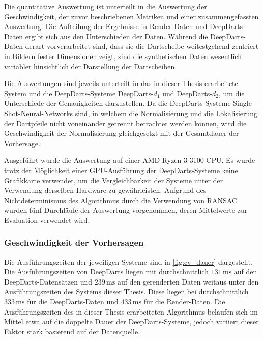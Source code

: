 Die quantitative Auswertung ist unterteilt in die Auswertung der Geschwindigkeit, der zuvor beschriebenen Metriken und einer zusammengefassten Auswertung. Die Aufteilung der Ergebnisse in Render-Daten und DeepDarts-Daten ergibt sich aus den Unterschieden der Daten. Während die DeepDarts-Daten derart vorverarbeitet sind, dass sie die Dartscheibe weitestgehend zentriert in Bildern fester Dimensionen zeigt, sind die synthetischen Daten wesentlich variabler hinsichtlich der Darstellung der Dartscheiben.

Die Auswertungen sind jeweils unterteilt in das in dieser Thesis erarbeitete System und die DeepDarts-Systeme DeepDarts-$d_1$ und DeepDarts-$d_2$, um die Unterschiede der Genauigkeiten darzustellen. Da die DeepDarts-Systeme Single-Shot-Neural-Networks sind, in welchem die Normalisierung und die Lokalisierung der Dartpfeile nicht voneinander getrennt betrachtet werden können, wird die Geschwindigkeit der Normalisierung gleichgesetzt mit der Gesamtdauer der Vorhersage.

Ausgeführt wurde die Auswertung auf einer AMD Ryzen 3 3100 CPU. Es wurde trotz der Möglichkeit einer GPU-Ausführung der DeepDarts-Systeme keine Grafikkarte verwendet, um die Vergleichbarkeit der Systeme unter der Verwendung derselben Hardware zu gewährleisten. Aufgrund des Nichtdeterminismus des Algorithmus durch die Verwendung von RANSAC wurden fünf Durchläufe der Auswertung vorgenommen, deren Mittelwerte zur Evaluation verwendet wird.

\subsubsection{Geschwindigkeit der Vorhersagen} %

\ExecutionTimes

Die Ausführungszeiten der jeweiligen Systeme sind in \autoref{fig:cv_dauer} dargestellt. Die Ausführungszeiten von DeepDarts liegen mit durchschnittlich $131\,\text{ms}$ auf den DeepDarts-Datensätzen und $239\,\text{ms}$ auf den gerenderten Daten weitaus unter den Ausführungszeiten des Systems dieser Thesis. Diese liegen bei durchschnittlich $333\,\text{ms}$ für die DeepDarts-Daten und $433\,\text{ms}$ für die Render-Daten. Die Ausführungszeiten des in dieser Thesis erarbeiteten Algorithmus belaufen sich im Mittel etwa auf die doppelte Dauer der DeepDarts-Systeme, jedoch variiert dieser Faktor stark basierend auf der Datenquelle.

